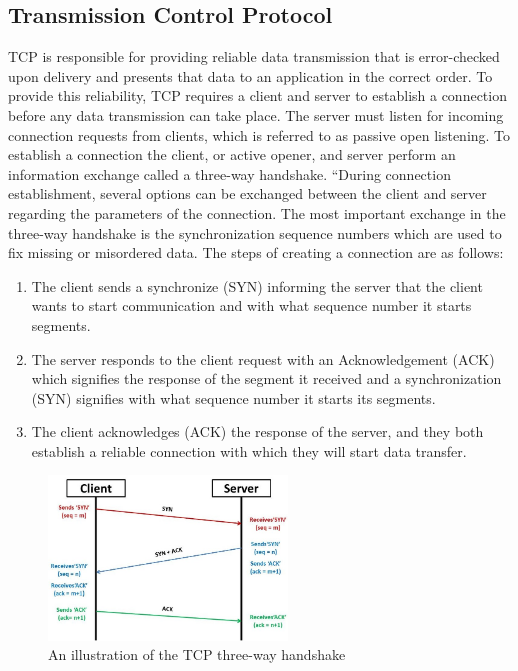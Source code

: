 \documentclass[sigplan,screen,nonacm]{acmart}
\begin{document}
\subsection{Transmission Control Protocol}
\label{sec:tcp}
TCP is responsible for providing reliable data transmission that is error-checked upon delivery and presents that data to an application in the correct order. To provide this reliability, TCP requires a client and server to establish a connection before any data transmission can take place. The server must listen for incoming connection requests from clients, which is referred to as passive open listening. To establish a connection the client, or active opener, and server perform an information exchange called a three-way handshake. “During connection establishment, several options can be exchanged between the client and server regarding the parameters of the connection. The most important exchange in the three-way handshake is the synchronization sequence numbers which are used to fix missing or misordered data.\cite{Stevens:2011} The steps of creating a connection are as follows:

\begin{enumerate}
  \item The client sends a synchronize (SYN) informing the server that the client wants to start communication and with what sequence number it starts segments.
  \item The server responds to the client request with an Acknowledgement (ACK) which signifies the response of the segment it received and a synchronization (SYN) signifies with what sequence number it starts its segments.
  \item The client acknowledges (ACK) the response of the server, and they both establish a reliable connection with which they will start data transfer.
\end{enumerate}

\begin{figure}[H]
\includegraphics[width=2.5in]{mptcp_paper/assets/tcp-3-way-handshake.jpg}
\caption{An illustration of the TCP three-way handshake}
\label{fig:handshake}
\end{figure}
\end{document}
